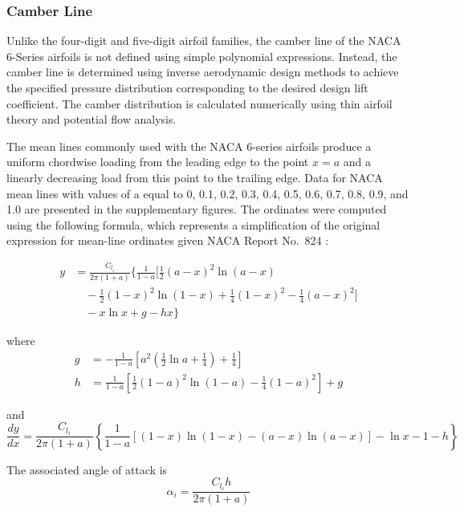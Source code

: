 
\subsubsection*{Camber Line}

Unlike the four-digit and five-digit airfoil families, the camber line of the NACA 6-Series airfoils is not defined using simple polynomial expressions. 
Instead, the camber line is determined using inverse aerodynamic design methods to achieve the specified pressure distribution corresponding to the desired design lift coefficient. 
The camber distribution is calculated numerically using thin airfoil theory and potential flow analysis.

The mean lines commonly used with the NACA 6-series airfoils produce a uniform chordwise loading from the leading edge to the point $x=a$ and a linearly decreasing load from this point to the trailing edge. 
Data for NACA mean lines with values of a equal to 0, 0.1, 0.2, 0.3, 0.4, 0.5, 0.6, 0.7, 0.8, 0.9, and 1.0 are presented in the
supplementary figures. 
The ordinates were computed using the following formula, which represents a simplification of the original expression for mean-line ordinates given NACA Report No.~824 \cite{NACA_TR_824}:

\begin{equation*}
\begin{aligned}
y &= 
\frac{C_{l_i}}{2\pi (1+a)}
\Bigg\{
\frac{1}{1-a}
\Bigg[
\frac{1}{2}(a-x)^2 \ln(a-x)  \\
&\quad
-\frac{1}{2}(1-x)^2 \ln(1-x)
+\frac{1}{4}(1-x)^2  
-\frac{1}{4}(a-x)^2
\Bigg] \\
&\quad
- x \ln x
+ g - hx
\Bigg\}
\end{aligned}
\end{equation*}

where 
\[
\begin{aligned}
g &= 
-\frac{1}{1-a}
\left[
a^2
\left(
\frac{1}{2}\ln{a}
+\frac{1}{4}
\right)
+\frac{1}{4}
\right] \\[8pt]
h &= 
\frac{1}{1-a}
\left[
\frac{1}{2}(1-a)^2\ln{(1-a)}
-\frac{1}{4}(1-a)^2
\right]
+g
\end{aligned}
\]

and
\[
\frac{dy}{dx}=
\frac{C_{l_i}}{2\pi(1+a)}
\left\{
\frac{1}{1-a}
\left[
(1-x)\ln{(1-x)}
-(a-x)\ln{(a-x)}
\right]
-\ln{x}
-1
-h
\right\}
\]

The associated angle of attack is 
\[
\alpha_i=
\frac{C_{l_i}h}{2\pi(1+a)}
\]

